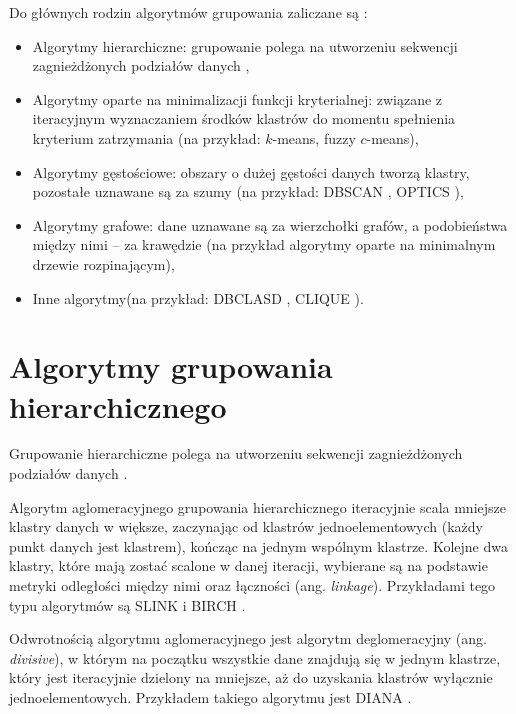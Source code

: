 \documentclass[a4paper,twoside,12pt]{book}
\newcommand{\obcy}[1]{\emph{#1}}
\newcommand{\english}[1]{{\selectlanguage{british}\obcy{#1}}}
\begin{document}
 

Do głównych rodzin algorytmów grupowania zaliczane są \cite{bib:clustering-alg-survey}:
\begin{itemize}
	\item Algorytmy hierarchiczne: grupowanie polega na utworzeniu sekwencji zagnieżdżonych podziałów danych \cite{bib:hierarchical-clustering},
	\item Algorytmy oparte na minimalizacji funkcji kryterialnej: związane z iteracyjnym wyznaczaniem środków klastrów do momentu spełnienia kryterium zatrzymania (na przykład: $k$-means, fuzzy $c$-means),
	\item Algorytmy gęstościowe: obszary o dużej gęstości danych tworzą klastry, pozostałe uznawane są za szumy (na przykład: DBSCAN \cite{bib:dbscan-algorithm}, OPTICS \cite{bib:optics-algorithm}),
	\item Algorytmy grafowe: dane uznawane są za wierzchołki grafów, a podobieństwa między nimi -- za krawędzie (na przykład algorytmy oparte na minimalnym drzewie rozpinającym), 
	\item Inne algorytmy(na przykład: DBCLASD \cite{bib:dbclasd-algorithm}, CLIQUE \cite{bib:clique-algorithm}).
\end{itemize}

\section{Algorytmy grupowania hierarchicznego}


Grupowanie hierarchiczne polega na utworzeniu sekwencji zagnieżdżonych podziałów danych \cite{bib:hierarchical-clustering}.

Algorytm aglomeracyjnego grupowania hierarchicznego iteracyjnie scala mniejsze klastry danych w większe, zaczynając od klastrów jednoelementowych (każdy punkt danych jest klastrem), kończąc na jednym wspólnym klastrze. 
Kolejne dwa klastry, które mają zostać scalone w danej iteracji, wybierane są na podstawie metryki odległości między nimi oraz łączności (ang. \english{linkage}). Przykładami tego typu algorytmów są SLINK \cite{bib:slink-algorithm} i BIRCH \cite{bib:birch-algorithm}.

Odwrotnością algorytmu aglomeracyjnego jest algorytm deglomeracyjny (ang. \english{divisive}), w którym na początku wszystkie dane znajdują się w jednym klastrze, który jest iteracyjnie dzielony na mniejsze, aż do uzyskania klastrów wyłącznie jednoelementowych. Przykładem takiego algorytmu jest DIANA \cite{bib:diana-algorithm}.
\end{document}

